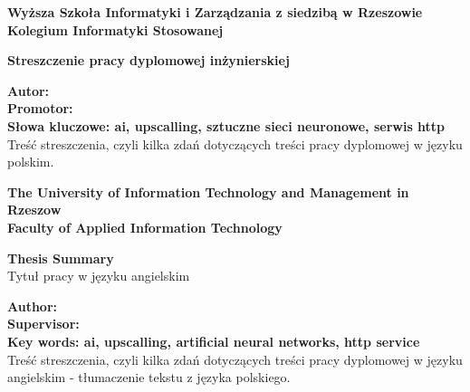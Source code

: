 ﻿%


\noindent
{\footnotesize{}\textbf{Wyższa Szkoła Informatyki i Zarządzania z siedzibą w Rzeszowie\\
Kolegium Informatyki Stosowanej}
\vspace{30pt}

\begin{center}
\textbf{Streszczenie pracy dyplomowej inżynierskiej}\\
\temat
\end{center}

\vspace{30pt}
\noindent
\textbf{Autor: \autor
\\Promotor: \promotor
\\Słowa kluczowe: ai, upscalling, sztuczne sieci neuronowe, serwis http}
\vspace{40pt}
\\Treść streszczenia, czyli kilka zdań dotyczących treści pracy dyplomowej w języku polskim.
\vspace{80pt}

\noindent
\textbf{The University of Information Technology and Management in Rzeszow\\
Faculty of Applied Information Technology}
\vspace{30pt}

\begin{center}
\textbf{Thesis Summary\\}
Tytuł pracy w języku angielskim
\end{center}

\vspace{30pt}
\noindent
\textbf{Author: \autor
\\Supervisor: \promotor
\\Key words: ai, upscalling, artificial neural networks, http service}
\vspace{40pt}
\\Treść streszczenia, czyli kilka zdań dotyczących treści pracy dyplomowej w języku angielskim - tłumaczenie tekstu z języka polskiego.
}


